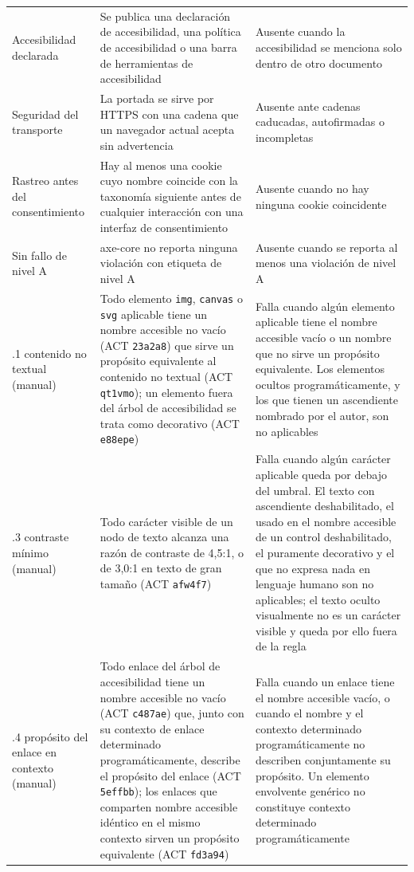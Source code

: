 \documentclass[pdflatex,sn-basic,Numbered,iicol]{sn-jnl}
\theoremstyle{thmstyleone}
\theoremstyle{thmstyletwo}
\theoremstyle{thmstylethree}
\begin{document}
\begin{appendices}
\begin{longtable}{@{}>{\RaggedRight}p{2.7cm}>{\RaggedRight}p{4.75cm}>{\RaggedRight\arraybackslash}p{4.55cm}@{}}
	\addlinespace
	Accesibilidad declarada & Se publica una declaraci\'on de accesibilidad, una pol\'itica de accesibilidad o una barra de herramientas de accesibilidad & Ausente cuando la accesibilidad se menciona solo dentro de otro documento \\
	\addlinespace
	Seguridad del transporte & La portada se sirve por HTTPS con una cadena que un navegador actual acepta sin advertencia & Ausente ante cadenas caducadas, autofirmadas o incompletas \\
	\addlinespace
	Rastreo antes del consentimiento & Hay al menos una cookie cuyo nombre coincide con la taxonom\'ia siguiente antes de cualquier interacci\'on con una interfaz de consentimiento & Ausente cuando no hay ninguna cookie coincidente \\
	\addlinespace
	Sin fallo de nivel A & axe-core no reporta ninguna violaci\'on con etiqueta de nivel A & Ausente cuando se reporta al menos una violaci\'on de nivel A \\
	\addlinespace
	1.1.1 contenido no textual (manual) & Todo elemento \verb|img|, \verb|canvas| o \verb|svg| aplicable tiene un nombre accesible no vac\'io (ACT \texttt{23a2a8}) que sirve un prop\'osito equivalente al contenido no textual (ACT \texttt{qt1vmo}); un elemento fuera del \'arbol de accesibilidad se trata como decorativo (ACT \texttt{e88epe}) & Falla cuando alg\'un elemento aplicable tiene el nombre accesible vac\'io o un nombre que no sirve un prop\'osito equivalente. Los elementos ocultos program\'aticamente, y los que tienen un ascendiente nombrado por el autor, son no aplicables \\
	\addlinespace
	1.4.3 contraste m\'inimo (manual) & Todo car\'acter visible de un nodo de texto alcanza una raz\'on de contraste de 4,5:1, o de 3,0:1 en texto de gran tama\~no (ACT \texttt{afw4f7}) & Falla cuando alg\'un car\'acter aplicable queda por debajo del umbral. El texto con ascendiente deshabilitado, el usado en el nombre accesible de un control deshabilitado, el puramente decorativo y el que no expresa nada en lenguaje humano son no aplicables; el texto oculto visualmente no es un car\'acter visible y queda por ello fuera de la regla \\
	\addlinespace
	2.4.4 prop\'osito del enlace en contexto (manual) & Todo enlace del \'arbol de accesibilidad tiene un nombre accesible no vac\'io (ACT \texttt{c487ae}) que, junto con su contexto de enlace determinado program\'aticamente, describe el prop\'osito del enlace (ACT \texttt{5effbb}); los enlaces que comparten nombre accesible id\'entico en el mismo contexto sirven un prop\'osito equivalente (ACT \texttt{fd3a94}) & Falla cuando un enlace tiene el nombre accesible vac\'io, o cuando el nombre y el contexto determinado program\'aticamente no describen conjuntamente su prop\'osito. Un elemento envolvente gen\'erico no constituye contexto determinado program\'aticamente \\
\end{longtable}
\normalsize


\end{appendices}
\end{document}
